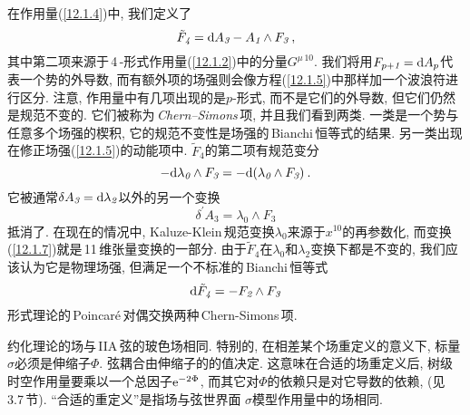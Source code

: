 在作用量(\ref{12.1.4})中, 我们定义了
\begin{equation}
    \tilde{F}_{\textit{4}}= \mathrm{d} A_{\textit{3}}-A_{\textit{1}}\wedge F_{\textit{3}} \:, \label{12.1.5}
\end{equation}
其中第二项来源于\,4\,-形式作用量(\ref{12.1.2})中的分量$ G^{\mu\,10}$. 我们将用$ F_{p+\textit{1}}=\mathrm{d} A_{p} $代表一个势的外导数, 而有额外项的场强则会像方程(\ref{12.1.5})中那样加一个波浪符进行区分. 注意, 作用量中有几项出现的是$ p $-形式, 而不是它们的外导数, 但它们仍然是规范不变的. 它们被称为\,\textit{Chern--Simons}\,项, 并且我们看到两类. 一类是一个势与任意多个场强的楔积, 它的规范不变性是场强的\,Bianchi\,恒等式的结果. 另一类出现在修正场强(\ref{12.1.5})的动能项中. $\tilde{F}_{\textit{4}} $的第二项有规范变分
\begin{equation}
    {-}\mathrm{d}\lambda_{\textit{0}} \wedge F_{\textit{3}} = - \mathrm{d}(\lambda_{\textit{0}}\wedge F_{\textit{3}}) \:. \label{12.1.6}
\end{equation}
它被通常$\delta A_{\textit{3}}=\mathrm{d}\lambda_{\textit{2}} $以外的另一个变换
\begin{equation}
    \delta^{\prime}A_{\textit{3}}=\lambda_{\textit{0}}\wedge F_{\textit{3}} \label{12.1.7}
\end{equation}
抵消了. 在现在的情况中, Kaluze-Klein\,规范变换$ \lambda_{\textit{0}} $来源于$ x^{10} $的再参数化, 而变换(\ref{12.1.7})就是\,11\,维张量变换的一部分. 由于$ \tilde{F}_{\textit{4}} $在$ \lambda_{\textit{0}} $和$ \lambda_{\textit{2}} $变换下都是不变的, 我们应该认为它是物理场强, 但满足一个不标准的\,Bianchi\,恒等式
\begin{equation}
    \mathrm{d} \tilde{F}_{\textit{4}}=-F_{\textit{2}}\wedge F_{\textit{3}}
\end{equation}
形式理论的\,Poincar\'{e}\,对偶交换两种\,Chern-Simons\,项.

约化理论的场与\,IIA\,弦的玻色场相同. 特别的, 在相差某个场重定义的意义下, 标量$ \sigma $必须是伸缩子$ \Phi$. 弦耦合由伸缩子的的值决定. 这意味在合适的场重定义后, 树级时空作用量要乘以一个总因子$ \mathrm{e}^{-2\Phi}$, 而其它对$ \Phi $的依赖只是对它导数的依赖, (见\,3.7\,节). ``合适的重定义''是指场与弦世界面 $\sigma $模型作用量中的场相同.

